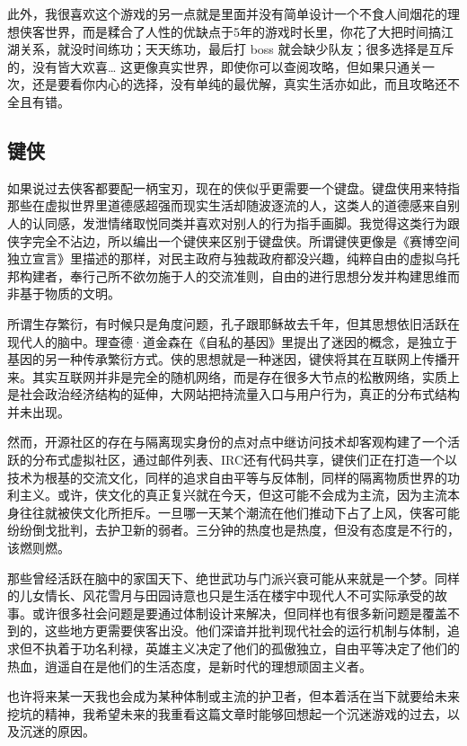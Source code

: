 \documentclass[
  letterpaper,
  DIV=11,
  numbers=noendperiod]{scrreprt}
\begin{document}
此外，我很喜欢这个游戏的另一点就是里面并没有简单设计一个不食人间烟花的理想侠客世界，而是糅合了人性的优缺点于5年的游戏时长里，你花了大把时间搞江湖关系，就没时间练功；天天练功，最后打
boss 就会缺少队友；很多选择是互斥的，没有皆大欢喜\ldots{}
这更像真实世界，即使你可以查阅攻略，但如果只通关一次，还是要看你内心的选择，没有单纯的最优解，真实生活亦如此，而且攻略还不全且有错。

\subsection{键侠}\label{ux952eux4fa0}

如果说过去侠客都要配一柄宝刃，现在的侠似乎更需要一个键盘。键盘侠用来特指那些在虚拟世界里道德感超强而现实生活却随波逐流的人，这类人的道德感来自别人的认同感，发泄情绪取悦同类并喜欢对别人的行为指手画脚。我觉得这类行为跟侠字完全不沾边，所以编出一个键侠来区别于键盘侠。所谓键侠更像是《赛博空间独立宣言》里描述的那样，对民主政府与独裁政府都没兴趣，纯粹自由的虚拟乌托邦构建者，奉行己所不欲勿施于人的交流准则，自由的进行思想分发并构建思维而非基于物质的文明。

所谓生存繁衍，有时候只是角度问题，孔子跟耶稣故去千年，但其思想依旧活跃在现代人的脑中。理查德·道金森在《自私的基因》里提出了迷因的概念，是独立于基因的另一种传承繁衍方式。侠的思想就是一种迷因，键侠将其在互联网上传播开来。其实互联网并非是完全的随机网络，而是存在很多大节点的松散网络，实质上是社会政治经济结构的延伸，大网站把持流量入口与用户行为，真正的分布式结构并未出现。

然而，开源社区的存在与隔离现实身份的点对点中继访问技术却客观构建了一个活跃的分布式虚拟社区，通过邮件列表、IRC还有代码共享，键侠们正在打造一个以技术为根基的交流文化，同样的追求自由平等与反体制，同样的隔离物质世界的功利主义。或许，侠文化的真正复兴就在今天，但这可能不会成为主流，因为主流本身往往就被侠文化所拒斥。一旦哪一天某个潮流在他们推动下占了上风，侠客可能纷纷倒戈批判，去护卫新的弱者。三分钟的热度也是热度，但没有态度是不行的，该燃则燃。

那些曾经活跃在脑中的家国天下、绝世武功与门派兴衰可能从来就是一个梦。同样的儿女情长、风花雪月与田园诗意也只是生活在楼宇中现代人不可实际承受的故事。或许很多社会问题是要通过体制设计来解决，但同样也有很多新问题是覆盖不到的，这些地方更需要侠客出没。他们深谙并批判现代社会的运行机制与体制，追求但不执着于功名利禄，英雄主义决定了他们的孤傲独立，自由平等决定了他们的热血，逍遥自在是他们的生活态度，是新时代的理想顽固主义者。

也许将来某一天我也会成为某种体制或主流的护卫者，但本着活在当下就要给未来挖坑的精神，我希望未来的我重看这篇文章时能够回想起一个沉迷游戏的过去，以及沉迷的原因。
\end{document}
